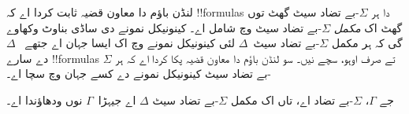 \documentclass[../../../include/open-logic-section]{subfiles}
\begin{document}


لنڈن باؤم دا معاون قضیہ ثابت کردا اے کہ !!{formula}s دا ہر $\Sigma$-بے تضاد سیٹ گھٹ توں گھٹ اک \emph{مکمل}
$\Sigma$-بے تضاد سیٹ وچ شامل اے۔ کینونیکل نمونے دی ساڈی بناوٹ وکھاوے گی کہ ہر مکمل $\Sigma$-بے تضاد سیٹ~$\Delta$ لئی کینونیکل نمونے وچ اک ایسا جہان اے جتھے ~$\Delta$ دے سارے !!{formula}s تے صرف اوہو، سچے نیں۔ سو لنڈن باؤم دا معاون قضیہ پکا کردا اے کہ ہر $\Sigma$-بے تضاد سیٹ کینونیکل نمونے دے کسے جہان وچ سچا اے۔

\begin{thm}
  جے $\Gamma$، $\Sigma$-بے تضاد اے، تاں اک مکمل
  $\Sigma$-بے تضاد سیٹ $\Delta$ اے جیہڑا~$\Gamma$ نوں ودھاؤندا اے۔
\end{thm}
\end{document}
